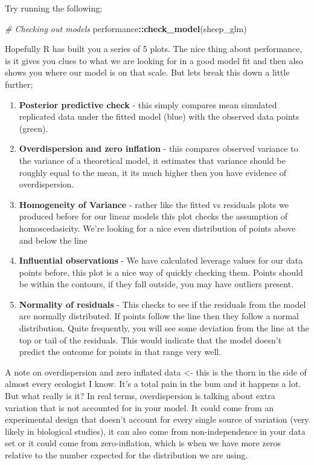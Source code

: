 \documentclass[
]{book}
\newenvironment{Shaded}{\begin{snugshade}}{\end{snugshade}}
\newcommand{\CommentTok}[1]{\textcolor[rgb]{0.56,0.35,0.01}{\textit{#1}}}
\newcommand{\FunctionTok}[1]{\textcolor[rgb]{0.13,0.29,0.53}{\textbf{#1}}}
\newcommand{\NormalTok}[1]{#1}
\newcommand{\SpecialCharTok}[1]{\textcolor[rgb]{0.81,0.36,0.00}{\textbf{#1}}}
\providecommand{\tightlist}{%
  \setlength{\itemsep}{0pt}\setlength{\parskip}{0pt}}
\begin{document}
Try running the following;

\begin{Shaded}
\begin{Highlighting}[]
\CommentTok{\# Checking out models}
\NormalTok{performance}\SpecialCharTok{::}\FunctionTok{check\_model}\NormalTok{(sheep\_glm)}
\end{Highlighting}
\end{Shaded}

Hopefully R has built you a series of 5 plots. The nice thing about performance, is it gives you clues to what we are looking for in a good model fit and then also shows you where our model is on that scale. But lets break this down a little further;

\begin{enumerate}
\def\labelenumi{\arabic{enumi})}
\tightlist
\item
  \textbf{Posterior predictive check} - this simply compares mean simulated replicated data under the fitted model (blue) with the observed data points (green).
\item
  \textbf{Overdispersion and zero inflation} - this compares observed variance to the variance of a theoretical model, it estimates that variance should be roughly equal to the mean, it its much higher then you have evidence of overdispersion.
\item
  \textbf{Homogeneity of Variance} - rather like the fitted vs residuals plots we produced before for our linear models this plot checks the assumption of homoscedasicity. We're looking for a nice even distribution of points above and below the line
\item
  \textbf{Influential observations} - We have calculated leverage values for our data points before, this plot is a nice way of quickly checking them. Points should be within the contours, if they fall outside, you may have outliers present.
\item
  \textbf{Normality of residuals} - This checks to see if the residuals from the model are normally distributed. If points follow the line then they follow a normal distribution. Quite frequently, you will see some deviation from the line at the top or tail of the residuals. This would indicate that the model doesn't predict the outcome for points in that range very well.
\end{enumerate}

A note on overdispersion and zero inflated data \textless- this is the thorn in the side of almost every ecologist I know. It's a total pain in the bum and it happens a lot. But what really is it? In real terms, overdispersion is talking about extra variation that is not accounted for in your model. It could come from an experimental design that doesn't account for every single source of variation (very likely in biological studies), it can also come from non-independence in your data set or it could come from zero-inflation, which is when we have more zeros relative to the number expected for the distribution we are using.
\end{document}
